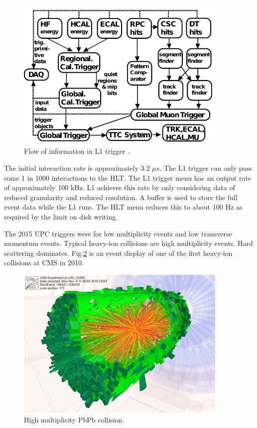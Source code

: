 \begin{figure}[h!]
\begin{centering}
\includegraphics[width=4in]{Chapter5/importfigs/l1_trigger_flow.png}
\par\end{centering}
\caption{Flow of information in L1 trigger \cite{Khachatryan:2016bia}. \label{fig:l1TriggerFlow}}
\end{figure}

The initial interaction rate is approximately $3.2$ $\mu s$. The L1 trigger can only pass some 1 in 1000 interactions to the HLT. The L1 trigger menu has an output rate of approximately 100 kHz. L1 achieves this rate by only considering data of reduced granularity and reduced resolution. A buffer is used to store the full event data while the L1 runs. The HLT menu reduces this to about 100 Hz as required by the limit on disk writing.

The 2015 UPC triggers were for low multiplicity events and low transverse momentum events. Typical heavy-ion collisions are high multiplicity events. Hard scattering dominates. Fig.\ref{fig:eventdisplayHI} is an event display of one of the first heavy-ion collisions at CMS in 2010.

\begin{figure}[h!]
\begin{centering}
\includegraphics[width=4in]{Chapter3/importfigs/cms_firstleadcoll.jpg}
\par\end{centering}
\caption{High multiplicity PbPb collision. \label{fig:eventdisplayHI}}
\end{figure}

